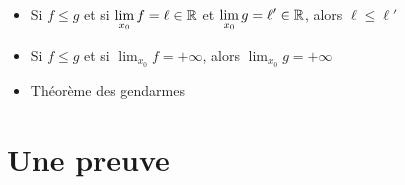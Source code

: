 \begin{frame}

\begin{proposition}
\begin{itemize}
  \item Si $f\leq g$ et si $\displaystyle\lim_{x_0} f=\ell\in\mathbb{R}$ et $\displaystyle\lim_{x_0} g=\ell'\in\mathbb{R}$, alors $\ell\leq \ell'$
  
\pause
  \item Si $f\leq g$ et si $\displaystyle\lim_{x_0} f=+\infty$, alors $\displaystyle\lim_{x_0} g=+\infty$
  
\pause
  \item Théorème des gendarmes
\end{itemize}
\end{proposition}

\pause

  
\end{frame}



\section{Une preuve}

